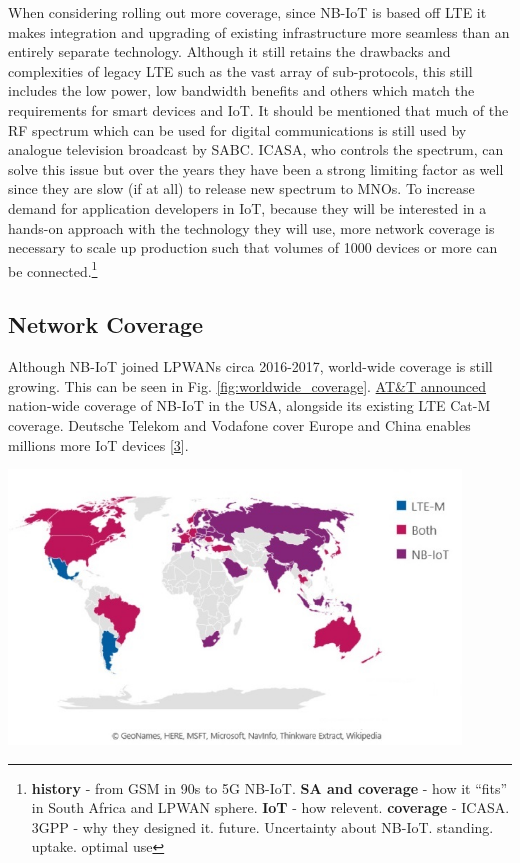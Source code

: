 \documentclass[]{article}
\let\origfigure\figure
\let\endorigfigure\endfigure
\renewenvironment{figure}[1][2] {
    \expandafter\origfigure\expandafter[H]
} {
    \endorigfigure
}
\begin{document}
When considering rolling out more coverage, since NB-IoT is based off
LTE it makes integration and upgrading of existing infrastructure more
seamless than an entirely separate technology. Although it still retains
the drawbacks and complexities of legacy LTE such as the vast array of
sub-protocols, this still includes the low power, low bandwidth benefits
and others which match the requirements for smart devices and IoT. It
should be mentioned that much of the RF spectrum which can be used for
digital communications is still used by analogue television broadcast by
SABC. ICASA, who controls the spectrum, can solve this issue but over
the years they have been a strong limiting factor as well since they are
slow (if at all) to release new spectrum to MNOs. To increase demand for
application developers in IoT, because they will be interested in a
hands-on approach with the technology they will use, more network
coverage is necessary to scale up production such that volumes of 1000
devices or more can be connected.\footnote{\textbf{history} - from GSM
  in 90s to 5G NB-IoT. \textbf{SA and coverage} - how it ``fits'' in
  South Africa and LPWAN sphere. \textbf{IoT} - how relevent.
  \textbf{coverage} - ICASA. 3GPP - why they designed it. future.
  Uncertainty about NB-IoT. standing. uptake. optimal use}

\hypertarget{coverage}{%
\subsection{Network Coverage}\label{coverage}}

Although NB-IoT joined LPWANs circa 2016-2017, world-wide coverage is
still growing. This can be seen in Fig. \ref{fig:worldwide_coverage}.
\href{https://blog.nordicsemi.com/getconnected/att-launches-nb-iot-network-in-usa}{AT\&T
announced} nation-wide coverage of NB-IoT in the USA, alongside its
existing LTE Cat-M coverage. Deutsche Telekom and Vodafone cover Europe
and China enables millions more IoT devices
{[}\protect\hyperlink{ref-china2019}{3}{]}.

\begin{figure}
\centering
\includegraphics[width=0.9\textwidth,height=\textheight]{../images/countries-deployed-nb-iot-lte-m-networks.jpg}
\caption{Countries with deployed/launched NB-IoT and LTE-M networks
 \label{fig:worldwide_coverage}}
\end{figure}
\end{document}
